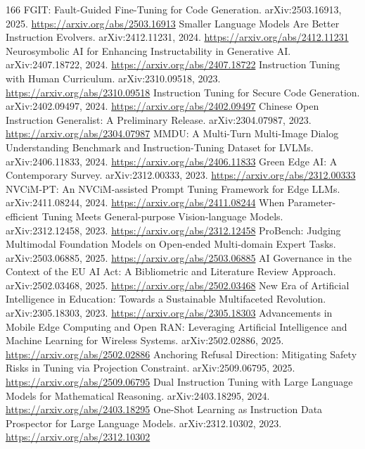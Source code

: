\documentclass[11pt]{article}
\begin{document}
\begin{thebibliography}{166}
 FGIT: Fault-Guided Fine-Tuning for Code Generation. arXiv:2503.16913, 2025. \url{https://arxiv.org/abs/2503.16913}
 Smaller Language Models Are Better Instruction Evolvers. arXiv:2412.11231, 2024. \url{https://arxiv.org/abs/2412.11231}
 Neurosymbolic AI for Enhancing Instructability in Generative AI. arXiv:2407.18722, 2024. \url{https://arxiv.org/abs/2407.18722}
 Instruction Tuning with Human Curriculum. arXiv:2310.09518, 2023. \url{https://arxiv.org/abs/2310.09518}
 Instruction Tuning for Secure Code Generation. arXiv:2402.09497, 2024. \url{https://arxiv.org/abs/2402.09497}
 Chinese Open Instruction Generalist: A Preliminary Release. arXiv:2304.07987, 2023. \url{https://arxiv.org/abs/2304.07987}
 MMDU: A Multi-Turn Multi-Image Dialog Understanding Benchmark and Instruction-Tuning Dataset for LVLMs. arXiv:2406.11833, 2024. \url{https://arxiv.org/abs/2406.11833}
 Green Edge AI: A Contemporary Survey. arXiv:2312.00333, 2023. \url{https://arxiv.org/abs/2312.00333}
 NVCiM-PT: An NVCiM-assisted Prompt Tuning Framework for Edge LLMs. arXiv:2411.08244, 2024. \url{https://arxiv.org/abs/2411.08244}
 When Parameter-efficient Tuning Meets General-purpose Vision-language Models. arXiv:2312.12458, 2023. \url{https://arxiv.org/abs/2312.12458}
 ProBench: Judging Multimodal Foundation Models on Open-ended Multi-domain Expert Tasks. arXiv:2503.06885, 2025. \url{https://arxiv.org/abs/2503.06885}
 AI Governance in the Context of the EU AI Act: A Bibliometric and Literature Review Approach. arXiv:2502.03468, 2025. \url{https://arxiv.org/abs/2502.03468}
 New Era of Artificial Intelligence in Education: Towards a Sustainable Multifaceted Revolution. arXiv:2305.18303, 2023. \url{https://arxiv.org/abs/2305.18303}
 Advancements in Mobile Edge Computing and Open RAN: Leveraging Artificial Intelligence and Machine Learning for Wireless Systems. arXiv:2502.02886, 2025. \url{https://arxiv.org/abs/2502.02886}
 Anchoring Refusal Direction: Mitigating Safety Risks in Tuning via Projection Constraint. arXiv:2509.06795, 2025. \url{https://arxiv.org/abs/2509.06795}
 Dual Instruction Tuning with Large Language Models for Mathematical Reasoning. arXiv:2403.18295, 2024. \url{https://arxiv.org/abs/2403.18295}
 One-Shot Learning as Instruction Data Prospector for Large Language Models. arXiv:2312.10302, 2023. \url{https://arxiv.org/abs/2312.10302}

\end{thebibliography}
\end{document}
